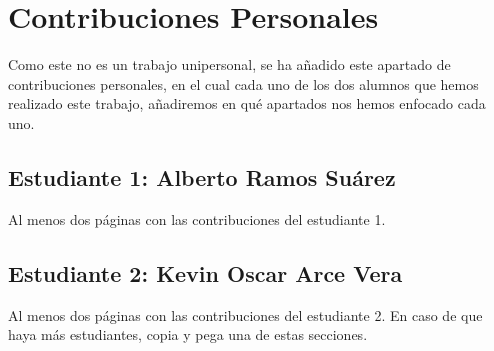 \chapter*{Contribuciones Personales}
\label{cap:contribucionesPersonales}

Como este no es un trabajo unipersonal, se ha añadido este apartado de contribuciones personales, en el cual cada uno de los dos alumnos que hemos realizado este trabajo, añadiremos en qué apartados nos hemos enfocado cada uno.

\section*{Estudiante 1: Alberto Ramos Suárez}
Al menos dos páginas con las contribuciones del estudiante 1.

\section*{Estudiante 2: Kevin Oscar Arce Vera}
Al menos dos páginas con las contribuciones del estudiante 2. En caso de que haya más estudiantes, copia y pega una de estas secciones.

